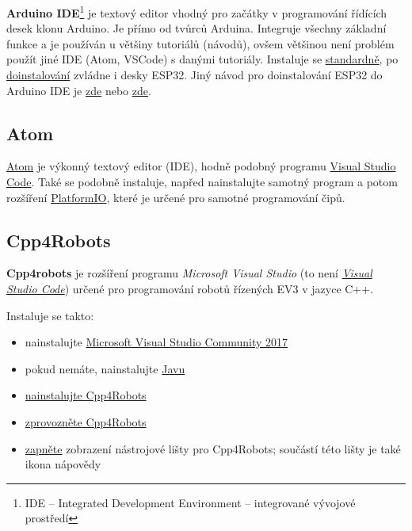 \textbf{Arduino IDE}\footnote{IDE -- Integrated Development Environment -- integrované vývojové prostředí } je textový editor vhodný pro začátky v programování řídících desek klonu Arduino. Je přímo od tvůrců Arduina. Integruje všechny základní funkce a je používán u většiny tutoriálů (návodů), ovšem většinou není problém použít jiné IDE (Atom, VSCode) s danými tutoriály.
Instaluje se \href{https://www.arduino.cc/en/Main/Software}{standardně},
po \href{https://github.com/RoboticsBrno/ArduinoLearningKitStarter/wiki/Instalace-s-Arduino-IDE
}{doinstalování}  zvládne i desky ESP32. 
Jiný návod pro doinstalování ESP32 do Arduino IDE je \href{http://navody.arduino-shop.cz/navody-k-produktum/vyvojova-deska-esp32.html}{zde} nebo 
\href{https://github.com/RoboticsBrno/Robotarna-service/blob/master/install_arduino-esp32.md}{zde}.

\subsection{Atom}  \label{atom}

 \href{https://atom.io/}{Atom} je výkonný textový editor (IDE), hodně podobný programu \hyperref[vscode]{Visual Studio Code}. 
 Také se podobně instaluje, napřed nainstalujte samotný program a potom rozšíření 
 \href{https://docs.platformio.org/en/latest/ide/atom.html#installation}{PlatformIO}, které je určené pro samotné programování čipů. 

\subsection{Cpp4Robots}  \label{Cpp4Robots}

\textbf{Cpp4robots} je rozšíření programu \textit{Microsoft Visual Studio} (to není \textit{ \hyperref[vscode]{Visual Studio Code}}) určené pro programování robotů řízených  EV3 v jazyce C++.

Instaluje se takto: 

\begin{itemize}
	\item nainstalujte \href{https://visualstudio.microsoft.com/cs/thank-you-downloading-visual-studio/?sku=Community&rel=15}{Microsoft Visual Studio Community 2017}
	\item pokud nemáte, nainstalujte \href{http://www.oracle.com/technetwork/java/javase/downloads/jdk8-downloads-2133151.html}{Javu}
	\item  \href{http://www.cpp4robots.cz/Cpp4Robots_Install_Extension.html}{nainstalujte Cpp4Robots}
	\item  \href{http://www.cpp4robots.cz/Cpp4Robots_Extension_Enable.html}{zprovozněte Cpp4Robots}
	\item \href{http://www.cpp4robots.cz/LegoEV3_ShowToolbar.html}{zapněte} zobrazení nástrojové lišty pro Cpp4Robots; součástí této lišty je také ikona nápovědy
\end{itemize}

